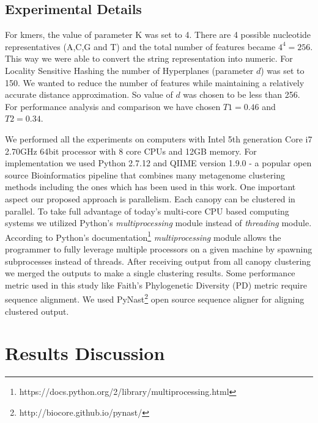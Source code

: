 \documentclass[10pt, conference, compsocconf]{IEEEtran}
\begin{document}
\subsection{Experimental Details}

For kmers, the value of parameter K was set to 4. There are 4 possible nucleotide representatives (A,C,G and T) and the total number of features became $4^4=256$. This way we were able to convert the string representation into numeric. For Locality Sensitive Hashing the number of Hyperplanes (parameter $d$) was set to 150. We wanted to reduce the number of features while maintaining a relatively accurate distance approximation. So value of $d$ was chosen to be less than 256. For performance analysis and comparison we have chosen $T1=0.46$ and $T2=0.34$.         

We performed all the experiments on computers with Intel 5th generation Core i7 2.70GHz 64bit processor with 8 core CPUs and 12GB memory. For implementation we used Python 2.7.12 and QIIME \cite{MARQiime} version 1.9.0 - a popular open source Bioinformatics pipeline that combines many metagenome clustering methods including the ones which has been used in this work. One important aspect our proposed approach is parallelism. Each canopy can be clustered in parallel. To take full advantage of today's multi-core CPU based computing systems we utilized Python's \textit{multiprocessing} module instead of \textit{threading} module. According to Python's documentation\footnote{https://docs.python.org/2/library/multiprocessing.html} \textit{multiprocessing} module allows the programmer to fully leverage multiple processors on a given machine by spawning subprocesses instead of threads. After receiving output from all canopy clustering we merged the outputs to make a single clustering results. Some performance metric used in this study like Faith’s Phylogenetic Diversity (PD) metric require sequence alignment. We used PyNast\footnote{http://biocore.github.io/pynast/} \cite{MARPynast} open source sequence aligner for aligning clustered output.    


\section{Results Discussion} 
\label{sec:results}
\end{document}
